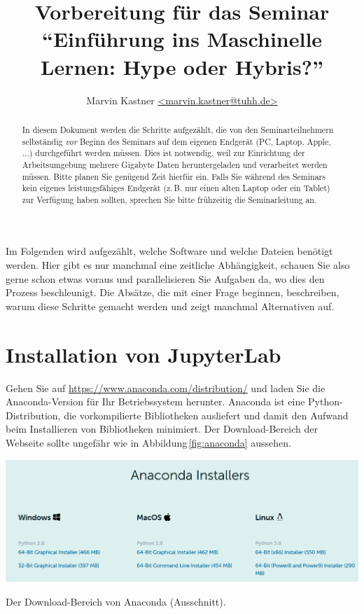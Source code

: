 \documentclass{tufte-handout}
\title{Vorbereitung für das Seminar \enquote{Einführung ins Maschinelle Lernen: Hype oder Hybris?}}
\author{Marvin Kastner \href{mailto:marvin.kastner@tuhh.de}{<marvin.kastner@tuhh.de>}}
\begin{document}
\maketitle%

\begin{abstract}
\noindent
In diesem Dokument werden die Schritte aufgezählt, die von den Seminarteilnehmern selbständig \emph{vor} Beginn des Seminars auf dem eigenen Endgerät (PC, Laptop, Apple, ...) durchgeführt werden müssen.
Dies ist notwendig, weil zur Einrichtung der Arbeitsumgebung mehrere Gigabyte Daten heruntergeladen und verarbeitet werden müssen.
Bitte planen Sie genügend Zeit hierfür ein.
Falls Sie während des Seminars kein eigenes leistungsfähiges Endgerät (z.\,B. nur einen alten Laptop oder ein Tablet) zur Verfügung haben sollten, sprechen Sie bitte frühzeitig die Seminarleitung an.
\end{abstract}

Im Folgenden wird aufgezählt, welche Software und welche Dateien benötigt werden.
Hier gibt es nur manchmal eine zeitliche Abhängigkeit, schauen Sie also gerne schon etwas voraus und parallelisieren Sie Aufgaben da, wo dies den Prozess beschleunigt.
Die Absätze, die mit einer Frage beginnen, beschreiben, warum diese Schritte gemacht werden und zeigt manchmal Alternativen auf.


\section{Installation von JupyterLab}

Gehen Sie auf
\url{https://www.anaconda.com/distribution/} 
und laden Sie die Anaconda-Version für Ihr Betriebssystem herunter.
Anaconda ist eine Python-Distribution, die vorkompilierte Bibliotheken ausliefert und damit den Aufwand beim Installieren von Bibliotheken minimiert.
Der Download-Bereich der Webseite sollte ungefähr wie in Abbildung\,\ref{fig:anaconda} aussehen.

\begin{marginfigure}
  \includegraphics{anaconda}
  \caption{Der Download-Bereich von Anaconda (Ausschnitt).}%
\label{fig:anaconda}
\end{marginfigure}
\end{document}
